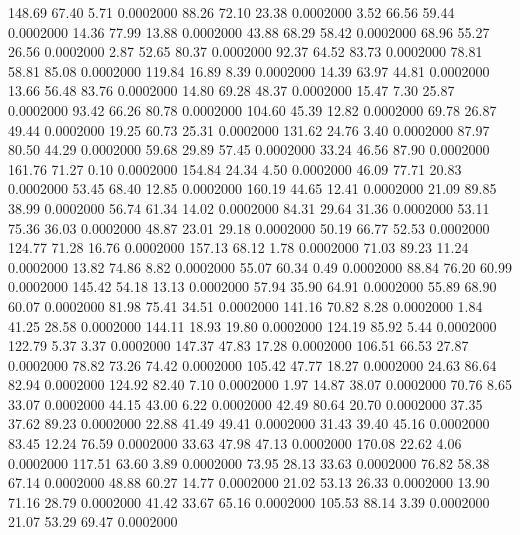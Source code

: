  148.69   67.40    5.71   0.0002000
  88.26   72.10   23.38   0.0002000
   3.52   66.56   59.44   0.0002000
  14.36   77.99   13.88   0.0002000
  43.88   68.29   58.42   0.0002000
  68.96   55.27   26.56   0.0002000
   2.87   52.65   80.37   0.0002000
  92.37   64.52   83.73   0.0002000
  78.81   58.81   85.08   0.0002000
 119.84   16.89    8.39   0.0002000
  14.39   63.97   44.81   0.0002000
  13.66   56.48   83.76   0.0002000
  14.80   69.28   48.37   0.0002000
  15.47    7.30   25.87   0.0002000
  93.42   66.26   80.78   0.0002000
 104.60   45.39   12.82   0.0002000
  69.78   26.87   49.44   0.0002000
  19.25   60.73   25.31   0.0002000
 131.62   24.76    3.40   0.0002000
  87.97   80.50   44.29   0.0002000
  59.68   29.89   57.45   0.0002000
  33.24   46.56   87.90   0.0002000
 161.76   71.27    0.10   0.0002000
 154.84   24.34    4.50   0.0002000
  46.09   77.71   20.83   0.0002000
  53.45   68.40   12.85   0.0002000
 160.19   44.65   12.41   0.0002000
  21.09   89.85   38.99   0.0002000
  56.74   61.34   14.02   0.0002000
  84.31   29.64   31.36   0.0002000
  53.11   75.36   36.03   0.0002000
  48.87   23.01   29.18   0.0002000
  50.19   66.77   52.53   0.0002000
 124.77   71.28   16.76   0.0002000
 157.13   68.12    1.78   0.0002000
  71.03   89.23   11.24   0.0002000
  13.82   74.86    8.82   0.0002000
  55.07   60.34    0.49   0.0002000
  88.84   76.20   60.99   0.0002000
 145.42   54.18   13.13   0.0002000
  57.94   35.90   64.91   0.0002000
  55.89   68.90   60.07   0.0002000
  81.98   75.41   34.51   0.0002000
 141.16   70.82    8.28   0.0002000
   1.84   41.25   28.58   0.0002000
 144.11   18.93   19.80   0.0002000
 124.19   85.92    5.44   0.0002000
 122.79    5.37    3.37   0.0002000
 147.37   47.83   17.28   0.0002000
 106.51   66.53   27.87   0.0002000
  78.82   73.26   74.42   0.0002000
 105.42   47.77   18.27   0.0002000
  24.63   86.64   82.94   0.0002000
 124.92   82.40    7.10   0.0002000
   1.97   14.87   38.07   0.0002000
  70.76    8.65   33.07   0.0002000
  44.15   43.00    6.22   0.0002000
  42.49   80.64   20.70   0.0002000
  37.35   37.62   89.23   0.0002000
  22.88   41.49   49.41   0.0002000
  31.43   39.40   45.16   0.0002000
  83.45   12.24   76.59   0.0002000
  33.63   47.98   47.13   0.0002000
 170.08   22.62    4.06   0.0002000
 117.51   63.60    3.89   0.0002000
  73.95   28.13   33.63   0.0002000
  76.82   58.38   67.14   0.0002000
  48.88   60.27   14.77   0.0002000
  21.02   53.13   26.33   0.0002000
  13.90   71.16   28.79   0.0002000
  41.42   33.67   65.16   0.0002000
 105.53   88.14    3.39   0.0002000
  21.07   53.29   69.47   0.0002000
